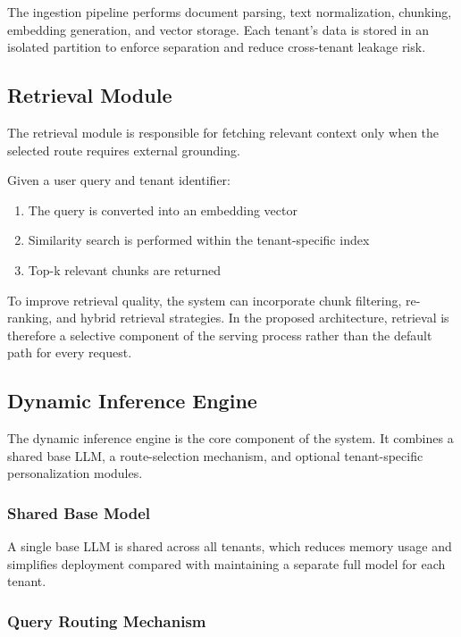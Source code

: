 The ingestion pipeline performs document parsing, text normalization, chunking, embedding generation, and vector storage. Each tenant's data is stored in an isolated partition to enforce separation and reduce cross-tenant leakage risk.

\subsection{Retrieval Module}

The retrieval module is responsible for fetching relevant context only when the selected route requires external grounding.

Given a user query and tenant identifier:
\begin{enumerate}
    \item The query is converted into an embedding vector
    \item Similarity search is performed within the tenant-specific index
    \item Top-k relevant chunks are returned
\end{enumerate}

To improve retrieval quality, the system can incorporate chunk filtering, re-ranking, and hybrid retrieval strategies. In the proposed architecture, retrieval is therefore a selective component of the serving process rather than the default path for every request.

\subsection{Dynamic Inference Engine}

The dynamic inference engine is the core component of the system. It combines a shared base LLM, a route-selection mechanism, and optional tenant-specific personalization modules.

\subsubsection{Shared Base Model}

A single base LLM is shared across all tenants, which reduces memory usage and simplifies deployment compared with maintaining a separate full model for each tenant.

\subsubsection{Query Routing Mechanism}

